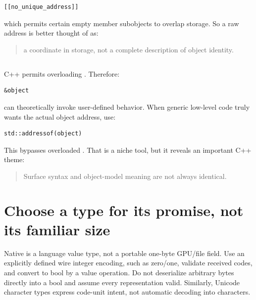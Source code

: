 \begin{verbatim}
[[no_unique_address]]
\end{verbatim}

which permits certain empty member subobjects to overlap storage. So a raw address is better thought of as:

\begin{quote}
a coordinate in storage, not a complete description of object identity.
\end{quote}

\subsection{\texorpdfstring{}{std::addressof}}\label{05-engine-i-ch002-stdaddressof}

\hypertarget{05-engine-i-ch002-stdaddressof}{}

C++ permits overloading . Therefore:

\begin{verbatim}
&object
\end{verbatim}

can theoretically invoke user-defined behavior. When generic low-level code truly wants the actual object address, use:

\begin{verbatim}
std::addressof(object)
\end{verbatim}

This bypasses overloaded . That is a niche tool, but it reveals an important C++ theme:

\begin{quote}
Surface syntax and object-model meaning are not always identical.
\end{quote}

\section{Choose a type for its promise, not its familiar size}\label{05-engine-i-ch002-choose-a-type-for-its-promise-not-its-familiar-size}

\hypertarget{05-engine-i-ch002-choose-a-type-for-its-promise-not-its-familiar-size}{}

Native  is a language value type, not a portable one-byte GPU/file field. Use an explicitly defined wire integer encoding, such as zero/one, validate received codes, and convert to bool by a value operation. Do not deserialize arbitrary bytes directly into a bool and assume every representation valid. Similarly, Unicode character types express code-unit intent, not automatic decoding into characters.

